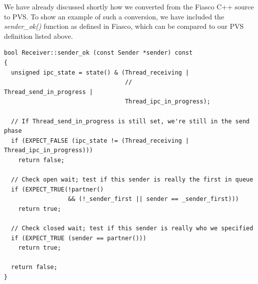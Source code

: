 We have already discussed shortly how we converted from the Fiasco C++ source to PVS. To show an example of such a conversion, we have included the \emph{sender\_ok()} function as defined in Fiasco, which can be compared to our PVS definition listed above.

\lstset{language=C++}
\begin{lstlisting}[caption={C++: \emph{sender\_ok()} function.}]
bool Receiver::sender_ok (const Sender *sender) const
{
  unsigned ipc_state = state() & (Thread_receiving |
                                  //                 Thread_send_in_progress |
                                  Thread_ipc_in_progress);

  // If Thread_send_in_progress is still set, we're still in the send phase
  if (EXPECT_FALSE (ipc_state != (Thread_receiving | Thread_ipc_in_progress)))
    return false;

  // Check open wait; test if this sender is really the first in queue
  if (EXPECT_TRUE(!partner()
                  && (!_sender_first || sender == _sender_first))) 
    return true;

  // Check closed wait; test if this sender is really who we specified
  if (EXPECT_TRUE (sender == partner()))
    return true;

  return false;
}
\end{lstlisting}

